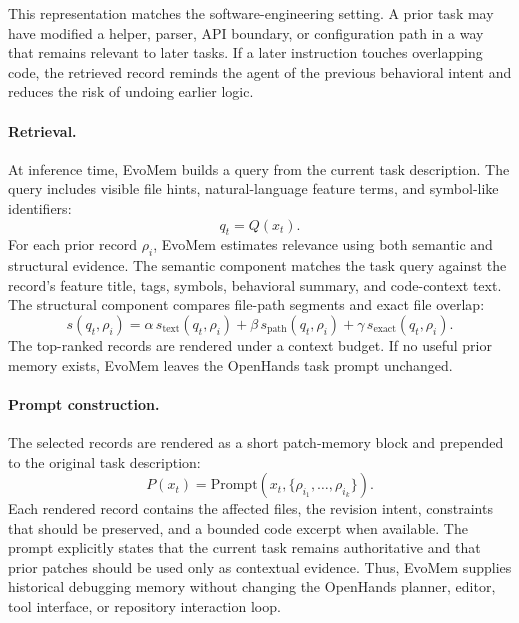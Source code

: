\documentclass{llmxive}
\begin{document}
This representation matches the software-engineering setting. A prior task may have modified a helper, parser, API boundary, or configuration path in a way that remains relevant to later tasks. If a later instruction touches overlapping code, the retrieved record reminds the agent of the previous behavioral intent and reduces the risk of undoing earlier logic.

\paragraph{Retrieval.}
At inference time, EvoMem builds a query from the current task description. The query includes visible file hints, natural-language feature terms, and symbol-like identifiers:
\[
q_t=Q(x_t).
\]
For each prior record $\rho_i$, EvoMem estimates relevance using both semantic and structural evidence. The semantic component matches the task query against the record's feature title, tags, symbols, behavioral summary, and code-context text. The structural component compares file-path segments and exact file overlap:
\[
s(q_t,\rho_i)
=
\alpha\,s_{\mathrm{text}}(q_t,\rho_i)
+
\beta\,s_{\mathrm{path}}(q_t,\rho_i)
+
\gamma\,s_{\mathrm{exact}}(q_t,\rho_i).
\]
The top-ranked records are rendered under a context budget. If no useful prior memory exists, EvoMem leaves the OpenHands task prompt unchanged.

\paragraph{Prompt construction.}
The selected records are rendered as a short patch-memory block and prepended to the original task description:
\[
P(x_t)=\mathrm{Prompt}\!\left(x_t,\{\rho_{i_1},\ldots,\rho_{i_k}\}\right).
\]
Each rendered record contains the affected files, the revision intent, constraints that should be preserved, and a bounded code excerpt when available. The prompt explicitly states that the current task remains authoritative and that prior patches should be used only as contextual evidence. Thus, EvoMem supplies historical debugging memory without changing the OpenHands planner, editor, tool interface, or repository interaction loop.
\end{document}

